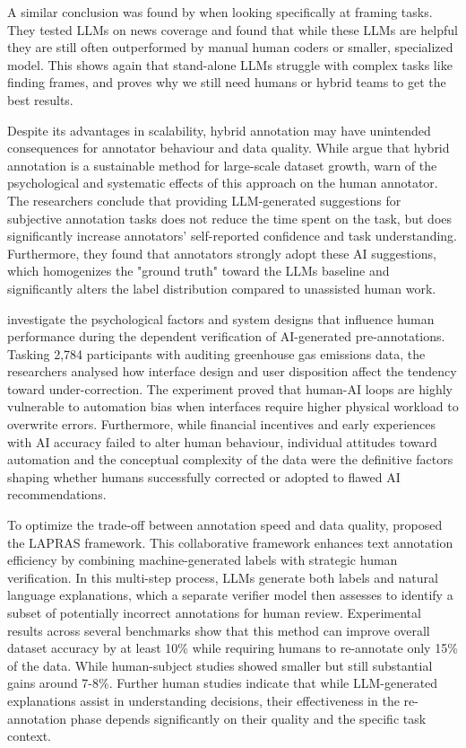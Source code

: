 \documentclass[
10pt, %
a4paper, %
oneside, %
headinclude,footinclude, %
] {book}%
\begin{document}
A similar conclusion was found by \cite{kunjar2025computational} when looking specifically at framing tasks. They tested LLMs on news coverage and found that while these LLMs are helpful they are still often outperformed by manual human coders or smaller, specialized model. This shows again that stand-alone LLMs struggle with complex tasks like finding frames, and proves why we still need humans or hybrid teams to get the best results.

Despite its advantages in scalability, hybrid annotation may have unintended consequences for annotator behaviour and data quality. While \cite{belcavello2025evaluating} argue that hybrid annotation is a sustainable method for large-scale dataset growth, \cite{schroeder2025just} warn of the psychological and systematic effects of this approach on the human annotator. The researchers conclude that providing LLM-generated suggestions for subjective annotation tasks does not reduce the time spent on the task, but does significantly increase annotators' self-reported confidence and task understanding. Furthermore, they found that annotators strongly adopt these AI suggestions, which homogenizes the "ground truth" toward the LLMs baseline and significantly alters the label distribution compared to unassisted human work.

\cite{beck2026bias} investigate the psychological factors and system designs that influence human performance during the dependent verification of AI-generated pre-annotations. Tasking 2,784 participants with auditing greenhouse gas emissions data, the researchers analysed how interface design and user disposition affect the tendency toward under-correction. The experiment proved that human-AI loops are highly vulnerable to automation bias when interfaces require higher physical workload to overwrite errors. Furthermore, while financial incentives and early experiences with AI accuracy failed to alter human behaviour, individual attitudes toward automation and the conceptual complexity of the data were the definitive factors shaping whether humans successfully corrected or adopted to flawed AI recommendations.

To optimize the trade-off between annotation speed and data quality, \cite{wang2024human} proposed the LAPRAS framework. This collaborative framework enhances text annotation efficiency by combining machine-generated labels with strategic human verification. In this multi-step process, LLMs generate both labels and natural language explanations, which a separate verifier model then assesses to identify a subset of potentially incorrect annotations for human review.
Experimental results across several benchmarks show that this method can improve overall dataset accuracy by at least 10\% while requiring humans to re-annotate only 15\% of the data. While human-subject studies showed smaller but still substantial gains around 7-8\%. Further human studies indicate that while LLM-generated explanations assist in understanding decisions, their effectiveness in the re-annotation phase depends significantly on their quality and the specific task context.
\end{document}
